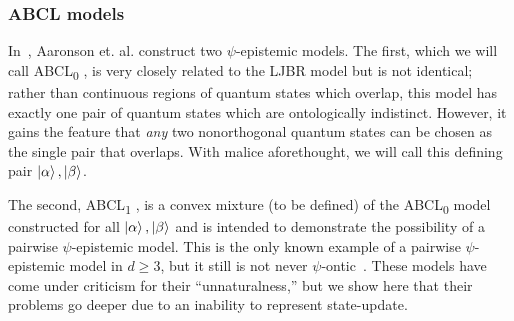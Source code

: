 \documentclass[%
 reprint, onecolumn, 12pt,
superscriptaddress,
nofootinbib,
 prx, 
]{quantumarticle}
\newcommand{\abclz}{{ABCL\textsubscript{0}} }
\newcommand{\abclo}{{ABCL\textsubscript{1}} }
\begin{document}
\subsubsection{ABCL models}
\label{sec:abcl-model}
In~\cite{Aaronsonpsepistemictheoriesrole2013}, Aaronson et. al. construct
two $\psi$-epistemic models. The first, which we will call \abclz, is
very closely related to the LJBR model but is not identical; rather
than continuous regions of quantum states which overlap, this model
has exactly one pair of quantum states which are ontologically
indistinct. However, it gains the feature that \emph{any} two
nonorthogonal quantum states can be chosen as the single pair that
overlaps. With malice aforethought, we will call this defining pair
$\ket\alpha,\ket\beta$.

The second, \abclo, is a convex mixture (to be defined) of the \abclz
model constructed for all $\ket\alpha,\ket\beta$ and is intended to
demonstrate the possibility of a pairwise $\psi$-epistemic model. This
is the only known example of a pairwise $\psi$-epistemic model in
$d\geq3$, but it still is not never
$\psi$-ontic~\cite{Leiferquantumstatereal2014,MontinaCommentmathoverflow2012}. These
models have come under criticism for their ``unnaturalness,'' but we
show here that their problems go deeper due to an inability to
represent state-update.
\end{document}
